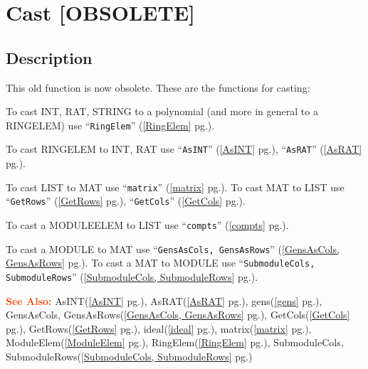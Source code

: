 \documentclass[a4paper]{mybook}
\newenvironment{command}{}{} %
\newcommand\SeeAlso{\par\textcolor{OrangeRed}{\textbf{\large See Also: }}}
\begin{document}
\section{Cast [OBSOLETE]}
\label{Cast [OBSOLETE]}
\begin{command} %



\subsection*{Description}

This old function is now obsolete.
These are the functions for casting:
\par 
To cast INT, RAT, STRING to a polynomial (and more in general
to a RINGELEM) use ``\verb&RingElem&'' (\ref{RingElem} pg.\pageref{RingElem}).
\par 
To cast RINGELEM to INT, RAT use ``\verb&AsINT&'' (\ref{AsINT} pg.\pageref{AsINT}), ``\verb&AsRAT&'' (\ref{AsRAT} pg.\pageref{AsRAT}).
\par 
To cast LIST to MAT use ``\verb&matrix&'' (\ref{matrix} pg.\pageref{matrix}).
To cast MAT to LIST use ``\verb&GetRows&'' (\ref{GetRows} pg.\pageref{GetRows}), ``\verb&GetCols&'' (\ref{GetCols} pg.\pageref{GetCols}).
\par 
To cast a MODULEELEM to LIST use ``\verb&compts&'' (\ref{compts} pg.\pageref{compts}).
\par 
To cast a MODULE to MAT use ``\verb&GensAsCols, GensAsRows&'' (\ref{GensAsCols, GensAsRows} pg.\pageref{GensAsCols, GensAsRows}).
To cast a MAT to MODULE use ``\verb&SubmoduleCols, SubmoduleRows&'' (\ref{SubmoduleCols, SubmoduleRows} pg.\pageref{SubmoduleCols, SubmoduleRows}).

\SeeAlso %
  AsINT(\ref{AsINT} pg.\pageref{AsINT}), 
    AsRAT(\ref{AsRAT} pg.\pageref{AsRAT}), 
    gens(\ref{gens} pg.\pageref{gens}), 
    GensAsCols, GensAsRows(\ref{GensAsCols, GensAsRows} pg.\pageref{GensAsCols, GensAsRows}), 
    GetCols(\ref{GetCols} pg.\pageref{GetCols}), 
    GetRows(\ref{GetRows} pg.\pageref{GetRows}), 
    ideal(\ref{ideal} pg.\pageref{ideal}), 
    matrix(\ref{matrix} pg.\pageref{matrix}), 
    ModuleElem(\ref{ModuleElem} pg.\pageref{ModuleElem}), 
    RingElem(\ref{RingElem} pg.\pageref{RingElem}), 
    SubmoduleCols, SubmoduleRows(\ref{SubmoduleCols, SubmoduleRows} pg.\pageref{SubmoduleCols, SubmoduleRows})
\end{command} %
\end{document}

